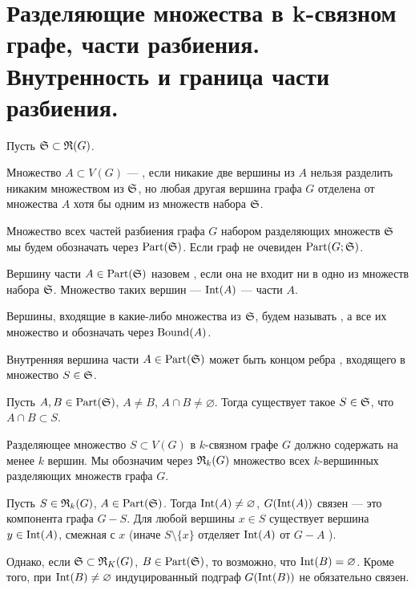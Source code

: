 \section{Разделяющие множества в k-связном графе, части разбиения. Внутренность и граница части разбиения.}
Пусть $\S \subset \RR(G)$.
\begin{definition}
    Множество $A \subset V(G)$ --- , если никакие две вершины из $A$ нельзя разделить никаким множеством из $\S$, но любая другая вершина графа $G$ отделена от множества $A$ хотя бы одним из множеств набора $\S$.

	Множество всех частей разбиения графа $G$ набором разделяющих множеств  $\S$ мы будем обозначать через $\Part(\S)$. Если граф не очевиден  $\Part(G; \S)$.

	Вершину части $A \in \Part(\S)$ назовем , если она не входит ни в одно из множеств набора $\S$. Множество таких вершин --- $\Int(A)$ ---  части $A$.

	Вершины, входящие в какие-либо множества из $\S$, будем называть , а все их множество  и обозначать через $\Bound(A)$.
\end{definition}

Внутренняя вершина части $A \in \Part(\S)$ может быть концом ребра , входящего в множество $S \in \S$.

Пусть $A, B \in \Part(\S)$, $A \neq B$, $A \cap B \neq \varnothing$. Тогда существует такое $S \in \S$, что $A \cap B \subset S$.

Разделяющее множество $S \subset V(G)$ в  $k$-связном графе $G$ должно содержать на менее $k$ вершин. Мы обозначим через $\RR_{k}(G)$ множество всех $k$-вершинных разделяющих множеств графа $G$.

Пусть $S \in \RR_{k}(G)$, $A \in \Part(\S)$. Тогда $\Int(A) \neq \varnothing$, $G(\Int(A))$ связен ---  это компонента графа $G - S$. Для любой вершины $x \in S$ существует вершина $y \in \Int(A)$, смежная с $x $ (иначе $S \setminus \{x\}$ отделяет $\Int(A)$ от $G - A$ ).

Однако, если $\S \subset\RR_K(G)$, $B \in \Part(\S)$, то возможно, что $\Int(B) = \varnothing$. Кроме того, при $\Int(B) \neq \varnothing$ индуцированный подграф $G(\Int(B))$ не обязательно связен.

